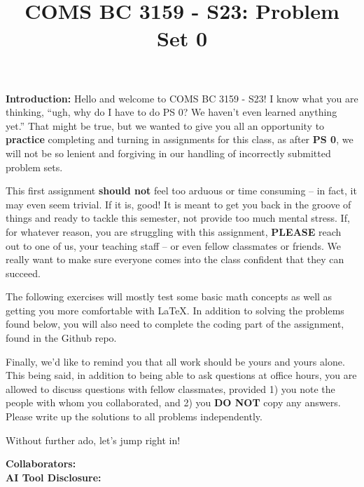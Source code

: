 \documentclass[]{article}
\title{COMS BC 3159 - S23: Problem Set 0}
\author{
}
\date{}
\begin{document}
\maketitle

\textbf{Introduction:}  
Hello and welcome to COMS BC 3159 - S23!  I know what you are thinking, ``ugh, why do I have to do PS 0?  We haven't even learned anything yet.''  That might be true, but we wanted to give you all an opportunity to \textbf{practice} completing and turning in assignments for this class, as after \textbf{PS 0}, we will not be so lenient and forgiving in our handling of incorrectly submitted problem sets.

This first assignment \textbf{should not} feel too arduous or time consuming -- in fact, it may even seem trivial.  If it is, good!  It is meant to get you back in the groove of things and ready to tackle this semester, not provide too much mental stress.  If, for whatever reason, you are struggling with this assignment, \textbf{PLEASE} reach out to one of us, your teaching staff -- or even fellow classmates or friends.  We really want to make sure everyone comes into the class confident that they can succeed.

The following exercises will mostly test some basic math concepts as well as getting you more comfortable with \LaTeX. In addition to solving the problems found below, you will also need to complete the coding part of the assignment, found in the Github repo. 

Finally, we'd like to remind you that all work should be yours and yours alone. This being said, in addition to being able to ask questions at office hours, you are allowed to discuss questions with fellow classmates, provided 1) you note the people with whom you collaborated, and 2) you \textbf{DO NOT} copy any answers. Please write up the solutions to all problems independently.

Without further ado, let's jump right in!

\bigskip
\textbf{Collaborators:}
\\
\textbf{AI Tool Disclosure:}
\clearpage
\end{document}

